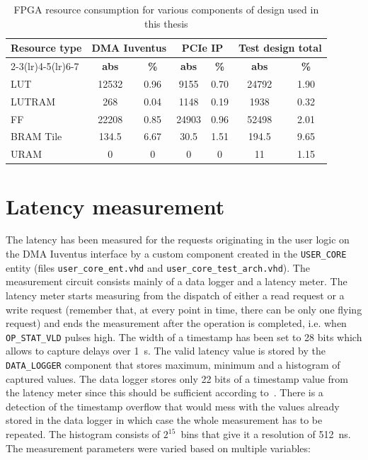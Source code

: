 \begin{table}[!ht]
    \centering
    \caption[FPGA resource consumption]{FPGA resource consumption for various components of design used in this thesis}
    \label{tab:res_cons}
    \begin{tabular}{lcccc|cc}
    \toprule
    \multirow{2}{*}{\textbf{Resource type}} & \multicolumn{2}{c}{\textbf{DMA Iuventus}} &
    \multicolumn{2}{c}{\textbf{PCIe IP}} & \multicolumn{2}{c}{\textbf{Test design total}} \\
    \cmidrule(lr){2-3}\cmidrule(lr){4-5}\cmidrule(lr){6-7}
                    & \textbf{abs} & \textbf{\%} & \textbf{abs} & \textbf{\%} &
                    \textbf{abs} & \textbf{\%} \\
    \midrule
    LUT             & 12532  & 0.96      & 9155   & 0.70      & 24792  & 1.90  \\
    LUTRAM          & 268    & 0.04      & 1148   & 0.19      & 1938   & 0.32  \\
    FF              & 22208  & 0.85      & 24903  & 0.96      & 52498  & 2.01  \\
    BRAM Tile       & 134.5  & 6.67      & 30.5   & 1.51      & 194.5  & 9.65  \\
    URAM            & 0      & 0         & 0      & 0         & 11     & 1.15  \\
    \bottomrule
    \end{tabular}
\end{table}

\section{Latency measurement}

The latency has been measured for the requests originating in the user logic on the DMA Iuventus
interface by a custom component created in the \verb|USER_CORE| entity (files
\verb|user_core_ent.vhd| and \verb|user_core_test_arch.vhd|). The measurement circuit consists
mainly of a data logger and a latency meter. The latency meter starts measuring from the dispatch of
either a read request or a write request (remember that, at every point in time, there can be only
one flying request) and ends the measurement after the operation is completed, i.e. when
\verb|OP_STAT_VLD| pulses high. The width of a timestamp has been set to 28 bits which allows to
capture delays over 1~\si{\second}. The valid latency value is stored by the \verb|DATA_LOGGER|
component that stores maximum, minimum and a histogram of captured values. The data logger stores
only 22 bits of a timestamp value from the latency meter since this should be sufficient according
to~\cite{spdk_paper,nvme_latency}. There is a detection of the timestamp
overflow that would mess with the values already stored in the data logger in which case the whole
measurement has to be repeated. The histogram consists of $2^{15}$~bins that give it a resolution of
512~ns. The measurement parameters were varied based on multiple variables:

